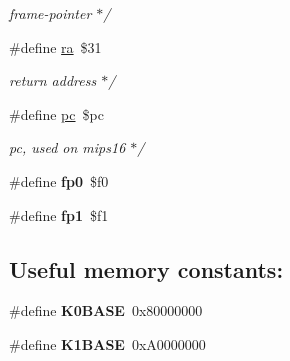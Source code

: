 \begin{DoxyCompactItemize}
\begin{DoxyCompactList}\small\item\em frame-\/pointer $\ast$/ \end{DoxyCompactList}\item 
\mbox{\label{group__mips__regs_ga6c3a7669c6bdfd66528633d977cdb6b8}} 
\#define \mbox{\hyperlink{group__mips__regs_ga6c3a7669c6bdfd66528633d977cdb6b8}{ra}}~\$31
\begin{DoxyCompactList}\small\item\em return address $\ast$/ \end{DoxyCompactList}\item 
\mbox{\label{group__mips__regs_ga2f03b14a71de24f7c904d4ce6d26d7f5}} 
\#define \mbox{\hyperlink{group__mips__regs_ga2f03b14a71de24f7c904d4ce6d26d7f5}{pc}}~\$pc
\begin{DoxyCompactList}\small\item\em pc, used on mips16 $\ast$/ \end{DoxyCompactList}\item 
\mbox{\label{group__mips__regs_ga5b9013f22618502a06a04dcae7fa5052}} 
\#define {\bfseries fp0}~\$f0
\item 
\mbox{\label{group__mips__regs_gaf6e152194cf39efa912c3f051353a5e3}} 
\#define {\bfseries fp1}~\$f1
\end{DoxyCompactItemize}
\subsection*{Useful memory constants\+:}
\begin{DoxyCompactItemize}
\item 
\mbox{\label{group__mips__regs_ga3895dc73e1b9343e0a0fd61037f0f887}} 
\#define {\bfseries K0\+B\+A\+SE}~0x80000000
\item 
\mbox{\label{group__mips__regs_ga6633ac67351b3315b65209bd155aa0e2}} 
\#define {\bfseries K1\+B\+A\+SE}~0x\+A0000000
\end{DoxyCompactItemize}
